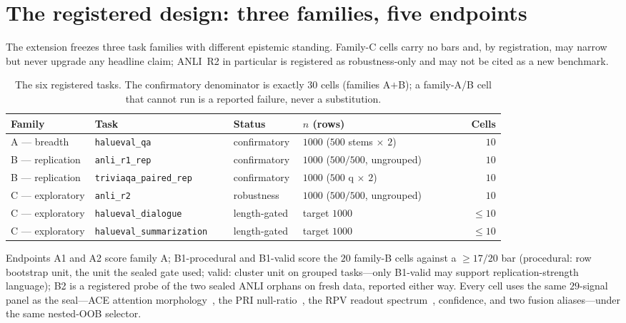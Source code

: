 \documentclass[11pt]{article}
\begin{document}
\section{The registered design: three families, five endpoints}

The extension freezes three task families with different epistemic standing. Family-C cells carry
no bars and, by registration, may narrow but never upgrade any headline claim; ANLI~R2 in
particular is registered as robustness-only and may not be cited as a new benchmark.

\begin{table}[H]
\centering\small
\begin{tabular}{@{}p{0.17\linewidth}p{0.28\linewidth}p{0.14\linewidth}p{0.26\linewidth}r@{}}
\toprule
Family & Task & Status & $n$ (rows) & Cells \\
\midrule
A --- breadth      & \texttt{halueval\_qa}            & confirmatory & $1000$ ($500$ stems $\times$ $2$) & $10$ \\
B --- replication  & \texttt{anli\_r1\_rep}           & confirmatory & $1000$ ($500/500$, ungrouped)     & $10$ \\
B --- replication  & \texttt{triviaqa\_paired\_rep}   & confirmatory & $1000$ ($500$ q $\times$ $2$)     & $10$ \\
C --- exploratory  & \texttt{anli\_r2}                & robustness   & $1000$ ($500/500$, ungrouped)     & $10$ \\
C --- exploratory  & \texttt{halueval\_dialogue}      & length-gated & target $1000$                     & $\leq 10$ \\
C --- exploratory  & \texttt{halueval\_summarization} & length-gated & target $1000$                     & $\leq 10$ \\
\bottomrule
\end{tabular}
\caption{The six registered tasks. The confirmatory denominator is exactly $30$ cells (families
A$+$B); a family-A/B cell that cannot run is a reported failure, never a substitution.}
\label{tab:families}
\end{table}

Endpoints A1 and A2 score family A; B1-procedural and B1-valid score the $20$ family-B cells
against a $\geq 17/20$ bar (procedural: row bootstrap unit, the unit the sealed gate used; valid:
cluster unit on grouped tasks---only B1-valid may support replication-strength language); B2 is a
registered probe of the two sealed ANLI orphans on fresh data, reported either way. Every cell
uses the same $29$-signal panel as the seal---ACE attention morphology~\cite{ace}, the PRI
null-ratio~\cite{pri}, the RPV readout spectrum~\cite{rpv}, confidence, and two fusion
aliases---under the same nested-OOB selector.
\end{document}
